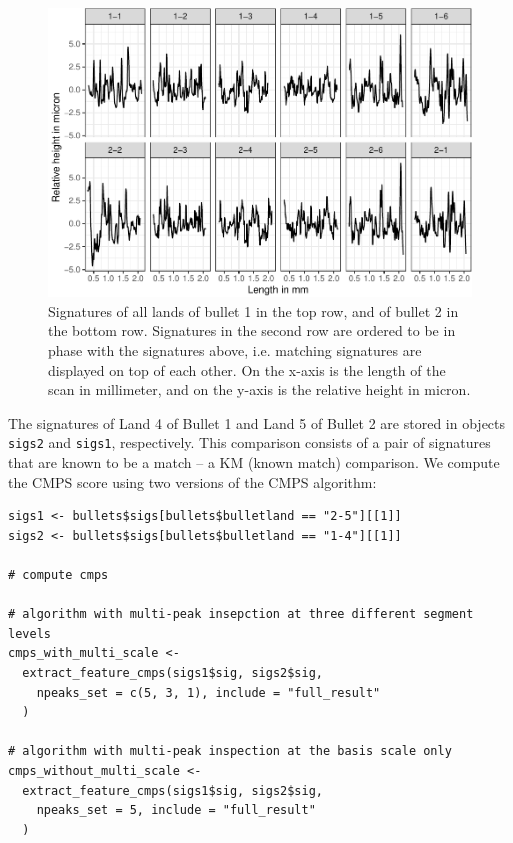 \begin{figure}

{\centering \includegraphics[width=\textwidth]{ju-hofmann_files/figure-latex/sigs-1} 

}

\caption{Signatures of all lands of bullet 1 in the top row, and of bullet 2 in the bottom row. Signatures in the second row are ordered to be in phase with the signatures above, i.e. matching signatures are displayed on top of each other. On the x-axis is the length of the scan in millimeter, and on the y-axis is the relative height in micron.}\label{fig:sigs}
\end{figure}

The signatures of Land 4 of Bullet 1 and Land 5 of Bullet 2 are stored in objects \texttt{sigs2} and \texttt{sigs1}, respectively.
This comparison consists of a pair of signatures that are known to be a match -- a KM (known match) comparison.
We compute the CMPS score using two versions of the CMPS algorithm:

\begin{verbatim}
sigs1 <- bullets$sigs[bullets$bulletland == "2-5"][[1]]
sigs2 <- bullets$sigs[bullets$bulletland == "1-4"][[1]]

# compute cmps

# algorithm with multi-peak insepction at three different segment levels
cmps_with_multi_scale <-
  extract_feature_cmps(sigs1$sig, sigs2$sig,
    npeaks_set = c(5, 3, 1), include = "full_result"
  )

# algorithm with multi-peak inspection at the basis scale only
cmps_without_multi_scale <-
  extract_feature_cmps(sigs1$sig, sigs2$sig,
    npeaks_set = 5, include = "full_result"
  )
\end{verbatim}

